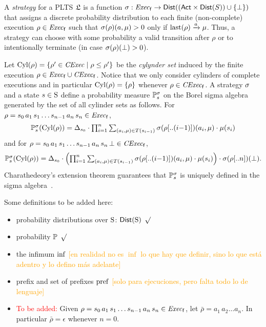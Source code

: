 A \emph{strategy} for a PLTS $\model$ is a function $\strat:
\execf \to \dist((\ACT\times\dist(S))\cup\{\complete\})$ that assigns
a discrete probability distribution to each finite (non-complete)
execution $\rho\in\execf$ such that $\strat(\rho)(a,\mu) > 0$ only
if $\last(\rho)\reach{a}\mu$.  Thus, a strategy can choose with some
probability a valid transition after $\rho$ or to intentionally
terminate (in case $\strat(\rho)(\complete)>0$).

Let $\Cyl(\rho)=\{\rho'\in\cexec\mid{\rho\leq\rho'}\}$ be the
\emph{cylynder set} induced by the finite execution
$\rho\in\execf\cup\cexecf$.  Notice that we only consider cylinders of
complete executions and in particular $\Cyl(\rho)=\{\rho\}$ whenever
$\rho\in\cexecf$.
%
A strategy $\strat$ and a state $s\in\S$ define a probability
measure $\Prob^\strat_s$ on the Borel sigma algebra generated by the
set of all cylinder sets as follows.
%
For $\rho = s_0\, a_1\, s_1\ldots s_{n-1}\, a_n\, s_n \in \execf$,
%
\[\textstyle\Prob^\strat_s(\Cyl(\rho)) = \Dirac_{s_0}\cdot\prod_{i=1}^n\sum_{(a_i,\mu)\in T(s_{i-1})}\strat(\rho[..(i{-}1)])(a_i,\mu)\cdot\mu(s_i)\]
%
and for
$\rho = s_0\, a_1\, s_1\ldots s_{n-1}\, a_n\, s_n\, \complete \in \cexecf$,
%
\[\textstyle\Prob^\strat_s(\Cyl(\rho)) = \Dirac_{s_0}\cdot\left(\prod_{i=1}^n\sum_{(a_i,\mu)\in T(s_{i-1})}\strat(\rho[..(i{-}1)])(a_i,\mu)\cdot\mu(s_i)\right)\cdot\strat(\rho[..n])(\complete).\]
%
Charathedeory's extension theorem guarantees that $\Prob^\strat_s$ is
uniquely defined in the sigma algebra~\cite{Segala95}.











\bigskip

Some definitions to be added here:

\begin{itemize}
    \item probability distributions over $\S$: $\dist(\S)$ \textcolor{green}{$\surd$}
    \item probability $\Prob$  \textcolor{green}{$\surd$}
    \item the infimum $\infim$  \textcolor{orange}{[en realidad no es $\inf$ lo que hay que definir, sino lo que est\'a adentro y lo defino m\'as adelante]}
    \item prefix and set of prefixes $\pref$ \textcolor{orange}{[solo para ejecuciones, pero falta todo lo de lenguaje]}
    \item \textcolor{red}{To be added:}
      Given $\rho = s_0\, a_1\, s_1\ldots s_{n-1}\, a_n\, s_n \in \execf$,
      let $\bar{\rho} = a_1\, a_2\ldots a_n$.
      In particular $\bar{\rho} = \epsilon$ whenever $n=0$.

\end{itemize}

